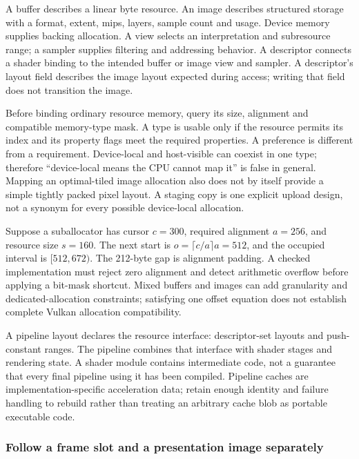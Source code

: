 A buffer describes a linear byte resource. An image describes structured storage with a format, extent, mips, layers, sample count and usage. Device memory supplies backing allocation. A view selects an interpretation and subresource range; a sampler supplies filtering and addressing behavior. A descriptor connects a shader binding to the intended buffer or image view and sampler. A descriptor's layout field describes the image layout expected during access; writing that field does not transition the image.

Before binding ordinary resource memory, query its size, alignment and compatible memory-type mask. A type is usable only if the resource permits its index and its property flags meet the required properties. A preference is different from a requirement. Device-local and host-visible can coexist in one type; therefore ``device-local means the CPU cannot map it'' is false in general. Mapping an optimal-tiled image allocation also does not by itself provide a simple tightly packed pixel layout. A staging copy is one explicit upload design, not a synonym for every possible device-local allocation.

Suppose a suballocator has cursor \(c=300\), required alignment \(a=256\), and resource size \(s=160\). The next start is \(o=\lceil c/a\rceil a=512\), and the occupied interval is \([512,672)\). The 212-byte gap is alignment padding. A checked implementation must reject zero alignment and detect arithmetic overflow before applying a bit-mask shortcut. Mixed buffers and images can add granularity and dedicated-allocation constraints; satisfying one offset equation does not establish complete Vulkan allocation compatibility.

A pipeline layout declares the resource interface: descriptor-set layouts and push-constant ranges. The pipeline combines that interface with shader stages and rendering state. A shader module contains intermediate code, not a guarantee that every final pipeline using it has been compiled. Pipeline caches are implementation-specific acceleration data; retain enough identity and failure handling to rebuild rather than treating an arbitrary cache blob as portable executable code.

\subsubsection{Follow a frame slot and a presentation image separately}\label{05-engine-i-ch019-follow-a-frame-slot-and-a-presentation-image-separately}

